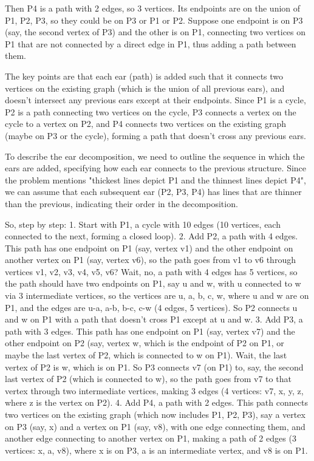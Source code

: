 Then P4 is a path with 2 edges, so 3 vertices. Its endpoints are on the union of P1, P2, P3, so they could be on P3 or P1 or P2. Suppose one endpoint is on P3 (say, the second vertex of P3) and the other is on P1, connecting two vertices on P1 that are not connected by a direct edge in P1, thus adding a path between them.

The key points are that each ear (path) is added such that it connects two vertices on the existing graph (which is the union of all previous ears), and doesn't intersect any previous ears except at their endpoints. Since P1 is a cycle, P2 is a path connecting two vertices on the cycle, P3 connects a vertex on the cycle to a vertex on P2, and P4 connects two vertices on the existing graph (maybe on P3 or the cycle), forming a path that doesn't cross any previous ears.

To describe the ear decomposition, we need to outline the sequence in which the ears are added, specifying how each ear connects to the previous structure. Since the problem mentions "thickest lines depict P1 and the thinnest lines depict P4", we can assume that each subsequent ear (P2, P3, P4) has lines that are thinner than the previous, indicating their order in the decomposition.

So, step by step:
1. Start with P1, a cycle with 10 edges (10 vertices, each connected to the next, forming a closed loop).
2. Add P2, a path with 4 edges. This path has one endpoint on P1 (say, vertex v1) and the other endpoint on another vertex on P1 (say, vertex v6), so the path goes from v1 to v6 through vertices v1, v2, v3, v4, v5, v6? Wait, no, a path with 4 edges has 5 vertices, so the path should have two endpoints on P1, say u and w, with u connected to w via 3 intermediate vertices, so the vertices are u, a, b, c, w, where u and w are on P1, and the edges are u-a, a-b, b-c, c-w (4 edges, 5 vertices). So P2 connects u and w on P1 with a path that doesn't cross P1 except at u and w.
3. Add P3, a path with 3 edges. This path has one endpoint on P1 (say, vertex v7) and the other endpoint on P2 (say, vertex w, which is the endpoint of P2 on P1, or maybe the last vertex of P2, which is connected to w on P1). Wait, the last vertex of P2 is w, which is on P1. So P3 connects v7 (on P1) to, say, the second last vertex of P2 (which is connected to w), so the path goes from v7 to that vertex through two intermediate vertices, making 3 edges (4 vertices: v7, x, y, z, where z is the vertex on P2).
4. Add P4, a path with 2 edges. This path connects two vertices on the existing graph (which now includes P1, P2, P3), say a vertex on P3 (say, x) and a vertex on P1 (say, v8), with one edge connecting them, and another edge connecting to another vertex on P1, making a path of 2 edges (3 vertices: x, a, v8), where x is on P3, a is an intermediate vertex, and v8 is on P1.

